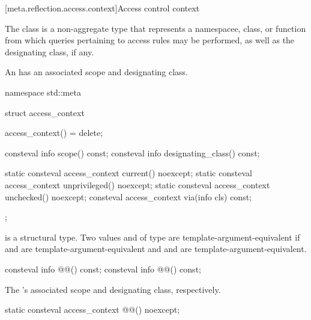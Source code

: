 [meta.reflection.access.context]{Access control context}

\pnum
The  class is a non-aggregate type
that represents a namespacee, class, or function
from which queries pertaining to access rules may be performed,
as well as the designating class, if any.

%
\pnum
An  has an associated scope and designating class.

%
\begin{codeblock}
namespace std::meta {
  struct access_context {
    access_context() = delete;

    consteval info scope() const;
    consteval info designating_class() const;

    static consteval access_context current() noexcept;
    static consteval access_context unprivileged() noexcept;
    static consteval access_context unchecked() noexcept;
    consteval access_context via(info cls) const;
  };
}
\end{codeblock}

\pnum
{} is a structural type.
Two values  and  of type 
are template-argument-equivalent
if  and 
are template-argument-equivalent
and  and 
are template-argument-equivalent.

\begin{itemdecl}
consteval info @@() const;
consteval info @@() const;
\end{itemdecl}

\begin{itemdescr}
\pnum
\returns
The 's associated scope
and designating class, respectively.
\end{itemdescr}

\begin{itemdecl}
static consteval access_context @@() noexcept;
\end{itemdecl}

